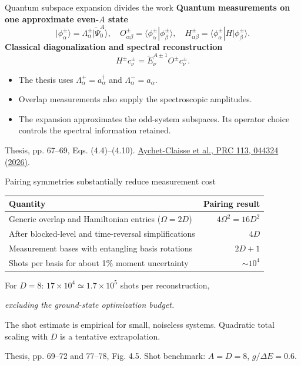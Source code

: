 \documentclass[11pt,aspectratio=169]{beamer}
\newcommand{\ket}[1]{\lvert #1\rangle}
\newcommand{\src}[1]{\par\vfill{\fontsize{7}{8}\selectfont\color{gray}#1\par}}
\begin{document}
\begin{frame}{Quantum subspace expansion divides the work}
\textbf{Quantum measurements on one approximate even-$A$ state}
\[
\ket{\phi_\alpha^\pm}=\Lambda_\alpha^\pm\ket{\widetilde\Psi_0^A},
\quad O_{\alpha\beta}^\pm=\langle\phi_\alpha^\pm|\phi_\beta^\pm\rangle,
\quad H_{\alpha\beta}^\pm=\langle\phi_\alpha^\pm|H|\phi_\beta^\pm\rangle .
\]
\textbf{Classical diagonalization and spectral reconstruction}
\[
H^\pm c_\nu^\pm=\widetilde E_\nu^{A\pm1}O^\pm c_\nu^\pm .
\]
\begin{itemize}\setlength\itemsep{.5em}
\item The thesis uses $\Lambda_\alpha^+=a_\alpha^\dagger$ and $\Lambda_\alpha^-=a_\alpha$.
\item Overlap measurements also supply the spectroscopic amplitudes.
\item The expansion approximates the odd-system subspaces. Its operator choice controls the spectral information retained.
\end{itemize}
\src{Thesis, pp. 67--69, Eqs. (4.4)--(4.10). \href{https://doi.org/10.1103/bw5d-d4d6}{Aychet-Claisse et al., PRC 113, 044324 (2026)}.}
\end{frame}

\begin{frame}{Pairing symmetries substantially reduce measurement cost}
\renewcommand{\arraystretch}{1.3}
\begin{tabular}{@{}p{}r@{}}
\toprule
\textbf{Quantity}&\textbf{Pairing result}\\\midrule
Generic overlap and Hamiltonian entries ($\Omega=2D$)&$4\Omega^2=16D^2$\\
After blocked-level and time-reversal simplifications&$4D$\\
Measurement bases with entangling basis rotations&$2D+1$\\
Shots per basis for about 1\% moment uncertainty&$\sim10^4$\\\bottomrule
\end{tabular}\par
\medskip
For $D=8$: $17\times10^4\simeq1.7\times10^5$ shots per reconstruction,\par
\emph{excluding the ground-state optimization budget.}\par
\medskip
The shot estimate is empirical for small, noiseless systems. Quadratic total scaling with $D$ is a tentative extrapolation.
\src{Thesis, pp. 69--72 and 77--78, Fig. 4.5. Shot benchmark: $A=D=8$, $g/\Delta E=0.6$.}
\end{frame}
\end{document}
